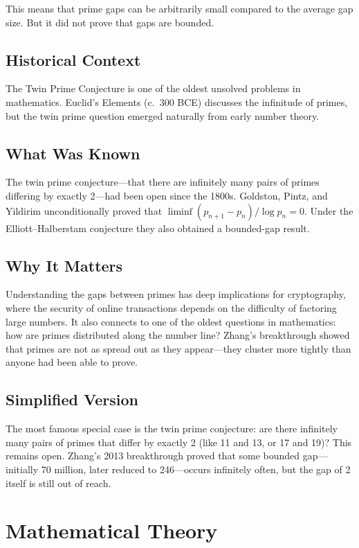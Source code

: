 This means that prime gaps can be arbitrarily small compared to the average gap size. But it did not prove that gaps are bounded.

\subsection{Historical Context}
The Twin Prime Conjecture is one of the oldest unsolved problems in mathematics. Euclid's Elements (c.\ 300 BCE) discusses the infinitude of primes, but the twin prime question emerged naturally from early number theory.

\subsection{What Was Known}
The twin prime conjecture---that there are infinitely many pairs of primes differing by exactly 2---had been open since the 1800s. Goldston, Pintz, and Yildirim unconditionally proved that $\liminf (p_{n+1}-p_n)/\log p_n=0$. Under the Elliott--Halberstam conjecture they also obtained a bounded-gap result.

\subsection{Why It Matters}
Understanding the gaps between primes has deep implications for cryptography, where the security of online transactions depends on the difficulty of factoring large numbers. It also connects to one of the oldest questions in mathematics: how are primes distributed along the number line? Zhang's breakthrough showed that primes are not as spread out as they appear---they cluster more tightly than anyone had been able to prove.

\subsection{Simplified Version}
The most famous special case is the twin prime conjecture: are there infinitely many pairs of primes that differ by exactly 2 (like 11 and 13, or 17 and 19)? This remains open. Zhang's 2013 breakthrough proved that some bounded gap---initially 70 million, later reduced to 246---occurs infinitely often, but the gap of 2 itself is still out of reach.

\section{Mathematical Theory}


